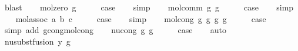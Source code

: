 \begin{isabellebody}
\ blast\isanewline
{}\isamarkupfalse%
\isanewline
\ \ \isamarkupfalse%
\ {\isacharparenleft}{\kern0pt}mol{\isacharunderscore}{\kern0pt}zero\ g{\isacharparenright}{\kern0pt}\isanewline
\ \ \isamarkupfalse%
\ \isamarkupfalse%
\ {\isacharquery}{\kern0pt}case\isanewline
\ \ \isamarkupfalse%
\ simp\isanewline
{}\isamarkupfalse%
\isanewline
\ \ \isamarkupfalse%
\ {\isacharparenleft}{\kern0pt}mol{\isacharunderscore}{\kern0pt}comm\ g{}\ g{}{\isacharparenright}{\kern0pt}\isanewline
\ \ \isamarkupfalse%
\ \isamarkupfalse%
\ {\isacharquery}{\kern0pt}case\isanewline
\ \ \isamarkupfalse%
\ simp\isanewline
{}\isamarkupfalse%
\isanewline
\ \ \isamarkupfalse%
\ {\isacharparenleft}{\kern0pt}mol{\isacharunderscore}{\kern0pt}assoc\ a\ b\ c{\isacharparenright}{\kern0pt}\isanewline
\ \ \isamarkupfalse%
\ \isamarkupfalse%
\ {\isacharquery}{\kern0pt}case\isanewline
\ \ \isamarkupfalse%
\ simp\isanewline
{}\isamarkupfalse%
\isanewline
\ \ \isamarkupfalse%
\ {\isacharparenleft}{\kern0pt}mol{\isacharunderscore}{\kern0pt}cong\ g{}\ g{}{\isacharprime}{\kern0pt}\ g{}\ g{}{\isacharprime}{\kern0pt}{\isacharparenright}{\kern0pt}\isanewline
\ \ \isamarkupfalse%
\ \isamarkupfalse%
\ {\isacharquery}{\kern0pt}case\isanewline
\ \ \isamarkupfalse%
\ {\isacharparenleft}{\kern0pt}simp\ add{\isacharcolon}{\kern0pt}\ gcong{\isachardot}{\kern0pt}mol{\isacharunderscore}{\kern0pt}cong{\isacharparenright}{\kern0pt}\isanewline
{}\isamarkupfalse%
\isanewline
\ \ \isamarkupfalse%
\ {\isacharparenleft}{\kern0pt}nu{\isacharunderscore}{\kern0pt}cong\ g\ g{\isacharprime}{\kern0pt}{\isacharparenright}{\kern0pt}\isanewline
\ \ \isamarkupfalse%
\ \isamarkupfalse%
\ {\isacharquery}{\kern0pt}case\isanewline
\ \ \isamarkupfalse%
\ auto\isanewline
{}\isamarkupfalse%
\isanewline
\ \ \isamarkupfalse%
\ {\isacharparenleft}{\kern0pt}nu{\isacharunderscore}{\kern0pt}subst{\isacharunderscore}{\kern0pt}fusion{}\ y\ g{\isacharparenright}{\kern0pt}\isanewline
\isanewline
\ \ \isamarkupfalse%

\end{isabellebody}
